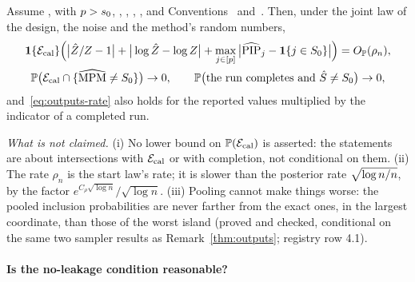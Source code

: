 \begin{remark}\label{thm:outputs}
Assume ,  with $p>s_0$, , , , , and Conventions~ and~. Then,
under the joint law of the design, the noise and the method's random numbers,
\begin{gather}
  \mathbf{1}\{\mathcal E_{\mathrm{cal}}\}\Big(\big|\hat Z/Z-1\big|+\big|\log\hat Z-\log Z\big|+\max_{j\in[p]}\big|\widehat{\mathrm{PIP}}_j-\mathbf{1}\{j\in S_0\}\big|\Big)
    =O_{\mathbb{P}}(\rho_n),\label{eq:outputs-rate}\\
  \mathbb{P}\big(\mathcal E_{\mathrm{cal}}\cap\{\widehat{\mathrm{MPM}}\neq S_0\}\big)\to0,\qquad \mathbb{P}\big(\text{the run completes and }\hat S\neq S_0\big)\to0,
    \label{eq:outputs-sel}
\end{gather}
and~\eqref{eq:outputs-rate} also holds for the reported values multiplied by the indicator of a completed run.
\end{remark}



\par\noindent\textit{What is not claimed.}\label{rem:outputs}
(i) No lower bound on $\mathbb{P}(\mathcal E_{\mathrm{cal}})$ is asserted: the statements are about intersections with $\mathcal E_{\mathrm{cal}}$ or with completion, not
conditional on them.
(ii) The rate $\rho_n$ is the start law's rate; it is slower than the posterior rate $\sqrt{\log n/n}$, by the factor
$e^{C_\rho\sqrt{\log n}}/\sqrt{\log n}$.
(iii) Pooling cannot make things worse: the pooled inclusion probabilities are never farther from the exact ones, in the
largest coordinate, than those of the worst island (proved and checked, conditional on the same two sampler results as
Remark~\ref{thm:outputs}; registry row 4.1).

\paragraph{Is the no-leakage condition reasonable?}\label{sec:a-pe}

